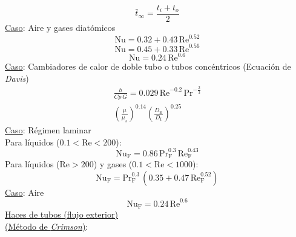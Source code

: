 \documentclass[letter,oneside,10pt]{article}
\begin{document}
\begin{multicols}{3}
\begin{equation*}
    \bar{t}_\infty = \frac{t_i + t_o}{2}
\end{equation*}
\underline{Caso}: Aire y gases diatómicos
\vspace{-0.3cm}
\begin{equation*}
    \text{Nu} = 0.32 + 0.43\,\text{Re}^{0.52}
\end{equation*}
\vspace{-0.3cm}
\begin{equation*}
    \text{Nu} = 0.45 + 0.33\,\text{Re}^{0.56}
\end{equation*}
\vspace{-0.2cm}
\begin{equation*}
    \text{Nu} = 0.24\,\text{Re}^{0.6}
\end{equation*}
\underline{Caso}: Cambiadores de calor de doble tubo o tubos concéntricos
(Ecuación de \emph{Davis})
\vspace{-0.3cm}
\begin{equation*}
    \begin{split}
        \frac{h}{Cp\,G} = 0.029\,
        \text{Re}^{-0.2}\,
        \text{Pr}^{-\frac{2}{3}}\\
        \left(\frac{\mu}{\mu_s}\right)^{0.14}
        \left(\frac{D_\text{E}}{D_\text{I}}\right)^{0.25}
    \end{split}
\end{equation*}
\underline{Caso}: Régimen laminar\\
Para líquidos ($0.1 < \text{Re} < 200$):
\vspace{-0.3cm}
\begin{equation*}
    \text{Nu}_\text{F} = 0.86\,\text{Pr}_\text{F}^{0.3}\,
    \text{Re}_\text{F}^{0.43}
\end{equation*}
Para líquidos ($\text{Re} > 200$) y gases ($0.1 < \text{Re} < 1000$):
\vspace{-0.3cm}
\begin{equation*}
    \text{Nu}_\text{F} = \text{Pr}_\text{F}^{0.3}\,
    (0.35 + 0.47\,\text{Re}_\text{F}^{0.52})
\end{equation*}
\underline{Caso}: Aire
\vspace{-0.3cm}
\begin{equation*}
    \text{Nu}_\text{F} = 0.24\,\text{Re}^{0.6}
\end{equation*}
\underline{Haces de tubos (flujo exterior)}\\
\underline{(Método de \emph{Crimson})}:
\vspace{-0.3cm}
\begin{equation*}

\end{equation*}
\end{multicols}
\end{document}
